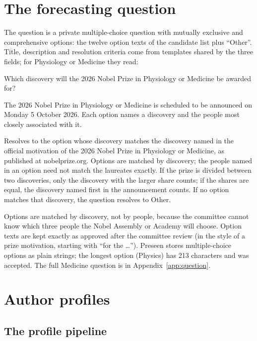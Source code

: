 \documentclass[11pt]{article}
\begin{document}
\section{The forecasting question}\label{sec:question}

The question is a private multiple-choice question with mutually exclusive and comprehensive options: the twelve
option texts of the candidate list plus ``Other''. Title, description and resolution criteria come from templates
shared by the three fields; for Physiology or Medicine they read:

\begin{description}[leftmargin=1.5em, style=nextline]
\item[Title] Which discovery will the 2026 Nobel Prize in Physiology or Medicine be awarded for?
\item[Description] The 2026 Nobel Prize in Physiology or Medicine is scheduled to be announced on Monday 5 October 2026. Each option names a discovery and the people most closely associated with it.
\item[Resolution criteria] Resolves to the option whose discovery matches the discovery named in the official motivation of the 2026 Nobel Prize in Physiology or Medicine, as published at nobelprize.org. Options are matched by discovery; the people named in an option need not match the laureates exactly. If the prize is divided between two discoveries, only the discovery with the larger share counts; if the shares are equal, the discovery named first in the announcement counts. If no option matches that discovery, the question resolves to Other.
\end{description}

Options are matched by discovery, not by people, because the committee cannot know which three people the Nobel
Assembly or Academy will choose. Option texts are kept exactly as approved after the committee review (in the style of
a prize motivation, starting with ``for the \ldots''). Preseen stores multiple-choice options as plain strings; the
longest option (Physics) has 213 characters and was accepted. The full Medicine question is in
Appendix~\ref{app:question}.
\section{Author profiles}\label{sec:profiles}

\subsection{The profile pipeline}
\end{document}
